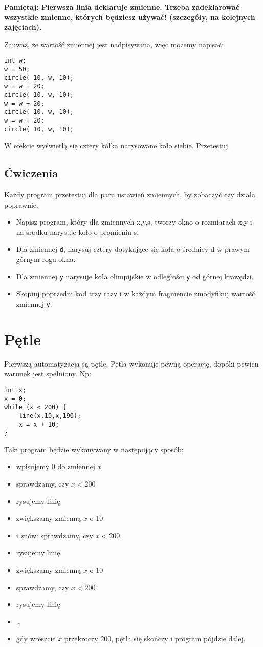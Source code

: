 \documentclass{instrukcja}
\begin{document}
{\bf {\red Pamiętaj:} Pierwsza linia deklaruje zmienne. Trzeba zadeklarować wszystkie zmienne, których będziesz używać! (szczegóły, na kolejnych zajęciach).}

Zauważ, że wartość zmiennej jest nadpisywana, więc możemy napisać:
\begin{verbatim}
int w;
w = 50;
circle( 10, w, 10);
w = w + 20;
circle( 10, w, 10);
w = w + 20;
circle( 10, w, 10);
w = w + 20;
circle( 10, w, 10);
\end{verbatim}
W efekcie wyświetlą się cztery kółka narysowane koło siebie. Przetestuj.
\subsection*{Ćwiczenia}
Każdy program przetestuj dla paru ustawień zmiennych, by zobaczyć czy działa poprawnie.
\begin{itemize}
\item Napisz program, który dla zmiennych x,y,s, tworzy okno o rozmiarach x,y i na środku narysuje koło o promieniu s.
\item Dla zmiennej {\tt d}, narysuj cztery dotykające się koła o średnicy d w prawym górnym rogu okna.
\item Dla zmiennej {\tt y} narysuje koła olimpijskie w odległości {\tt y} od górnej krawędzi.
\item Skopiuj poprzedni kod trzy razy i w każdym fragmencie zmodyfikuj wartość zmiennej {\tt y}.
\end{itemize}

\section{Pętle}
Pierwszą automatyzacją są pętle. Pętla wykonuje pewną operację, dopóki pewien warunek jest spełniony. Np:
\begin{verbatim}
int x;
x = 0;
while (x < 200) {
    line(x,10,x,190);
    x = x + 10;
}
\end{verbatim}
Taki program będzie wykonywany w następujący sposób:
\begin{itemize}
\item wpisujemy $0$ do zmiennej $x$
\item sprawdzamy, czy $x<200$
\item rysujemy linię
\item zwiększamy zmienną $x$ o $10$
\item i znów: sprawdzamy, czy $x<200$
\item rysujemy linię
\item zwiększamy zmienną $x$ o $10$
\item sprawdzamy, czy $x<200$
\item rysujemy linię
\item \ldots
\item gdy wreszcie $x$ przekroczy $200$, pętla się skończy i program pójdzie dalej.
\end{itemize}
\end{document}
